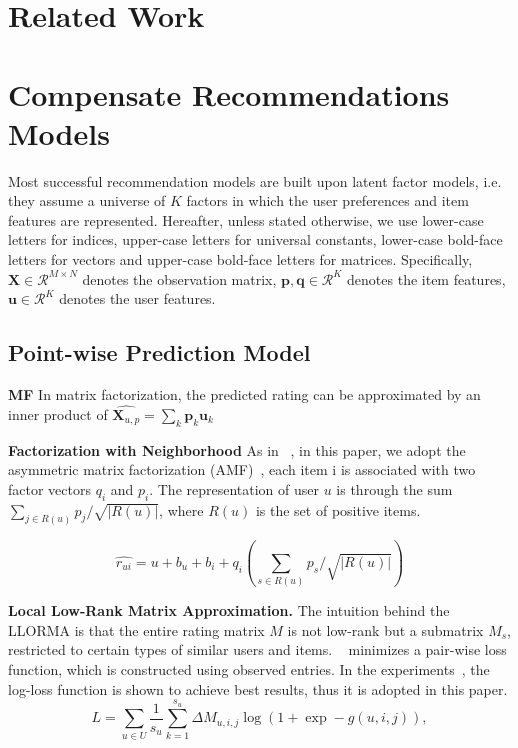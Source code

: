 \documentclass[letterpaper]{article} %
\newcommand{\Real}{\mathcal{R}}
\begin{document}
\section{Related Work}

\section{Compensate Recommendations Models}
Most successful recommendation models are built upon latent factor models, i.e. they assume a universe of $K$ factors in which the user preferences and item features are represented. Hereafter, unless stated otherwise, we use lower-case letters for indices, upper-case letters for universal constants, lower-case bold-face letters for vectors and upper-case bold-face letters for matrices. Specifically, $\mathbf{X}\in \Real^{M\times N}$ denotes the observation matrix, $\mathbf{p},\mathbf{q}\in \Real^K$ denotes the item features, $\mathbf{u}\in \Real^K$ denotes the user features.  

\subsection{Point-wise Prediction Model}


\textbf{MF} In matrix factorization, the predicted rating can be approximated by an inner product of $\hat{\mathbf{X}_{u,p}}=\sum_k \mathbf{p}_k \mathbf{u}_k$

\textbf{Factorization with Neighborhood} As in ~\cite{Steck2015Gaussian}, in this paper, we adopt the asymmetric matrix factorization (AMF)~\cite{Steck2015Gaussian}, each item i is associated with two factor vectors $q_i$ and $p_i$. The representation of user $u$ is through the sum $\sum_{j \in R(u)} p_j/\sqrt{|R(u)|}$, where $R(u)$ is the set of positive items.  
 
  \begin{equation}
\hat{r_{ui}}=u+b_u+b_i+q_i (\sum_{s \in R(u)} p_s/\sqrt{|R(u)|} )
\end{equation}


\textbf{Local Low-Rank Matrix Approximation.} The intuition behind the LLORMA is that the entire rating matrix $M$ is not low-rank but a submatrix $M_s$, restricted to certain types of similar users and items. ~\cite{Lee2014Local} minimizes a pair-wise loss function, which is constructed using observed entries. In the experiments~\cite{Lee2014Local},  the log-loss function is shown to achieve best results, thus it is adopted in this paper.
 \begin{equation}
L=\sum_{u\in U} \frac{1}{s_u} \sum_{k=1}^{s_u} \Delta M_{u,i,j}  \log (1+\exp - g(u,i,j) ),
\end{equation}
\end{document}
